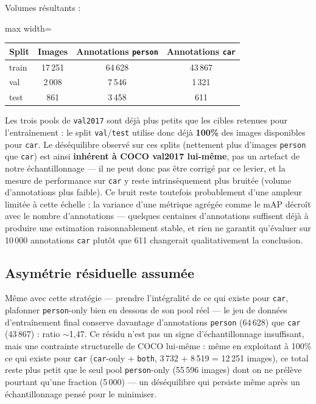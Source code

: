\documentclass[11pt,a4paper]{article}
\let\Oldsubsection\subsection
\renewcommand{\subsection}{\FloatBarrier\Oldsubsection}
\begin{document}
    Volumes résultants :
    
    \begin{table}[!htbp]
    \centering
    \small
    \begin{adjustbox}{max width=\linewidth}
    \begin{tabular}{@{}lccc@{}}
    \toprule
    \textbf{Split} & \textbf{Images} & \textbf{Annotations \texttt{person}} & \textbf{Annotations \texttt{car}} \\
    \midrule
    train & 17\,251 & 64\,628 & 43\,867 \\
    val   & 2\,008  & 7\,546  & 1\,321  \\
    test  & 861     & 3\,458  & 611     \\
    \bottomrule
    \end{tabular}
    \end{adjustbox}
    \end{table}
    
    Les trois pools de \texttt{val2017} sont déjà plus petits que les
    cibles retenues pour l'entraînement : le split \texttt{val}/\texttt{test}
    utilise donc déjà \textbf{100\%} des images disponibles pour
    \texttt{car}. Le déséquilibre observé sur ces splits (nettement plus
    d'images \texttt{person} que \texttt{car}) est ainsi \textbf{inhérent
    à COCO val2017 lui-même}, pas un artefact de notre échantillonnage ---
    il ne peut donc pas être corrigé par ce levier, et la mesure de
    performance sur \texttt{car} y reste intrinsèquement plus bruitée
    (volume d'annotations plus faible).
    Ce bruit reste toutefois probablement d'une
    ampleur limitée à cette échelle : la variance d'une métrique agrégée
    comme le mAP décroît avec le nombre d'annotations --- quelques centaines d'annotations
    suffisent déjà à produire une estimation raisonnablement stable, et
    rien ne garantit qu'évaluer sur 10\,000 annotations \texttt{car}
    plutôt que 611 changerait qualitativement la conclusion.
    
    \subsection{Asymétrie résiduelle assumée}
    \label{sec:asymetrie-residuelle}
    
    Même avec cette stratégie --- prendre l'intégralité de ce qui existe
    pour \texttt{car}, plafonner \texttt{person}-only bien en dessous de
    son pool réel --- le jeu de données d’entraînement final conserve davantage
    d'annotations \texttt{person} (64\,628) que \texttt{car} (43\,867) :
    ratio $\sim$1,47. Ce résidu n'est pas un signe d'échantillonnage
    insuffisant, mais une contrainte structurelle de COCO lui-même : même
    en exploitant à 100\% ce qui existe pour \texttt{car} (\texttt{car}-only
    + \texttt{both}, 3\,732 + 8\,519 = 12\,251 images), ce total reste
    plus petit que le seul pool \texttt{person}-only (55\,596 images) dont
    on ne prélève pourtant qu'une fraction (5\,000) --- un déséquilibre
    qui persiste même après un échantillonnage pensé pour le minimiser.
    
\end{document}
